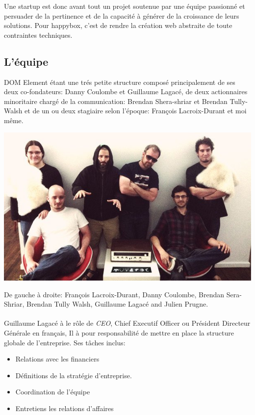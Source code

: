 \documentclass[11pt, a4paper ]{article}
\begin{document}
Une startup est donc avant tout un projet soutenue par une équipe passionné et persuader de la pertinence et de la capacité à générer de la croissance de leurs solutions. Pour happybox, c'est de rendre la création web abstraite de toute contraintes techniques.



		\subsection{L'équipe} %
DOM Element étant une trés petite structure composé principalement de ses deux co-fondateurs: Danny Coulombe et Guillaume Lagacé, de deux actionnaires minoritaire chargé de la communication: Brendan Shera-shriar et Brendan Tully-Walsh et de un ou deux stagiaire selon l'époque: François Lacroix-Durant et moi même.

\begin{center}
	\includegraphics[width=\textwidth]{images/team/team.jpg}

	 De gauche à droite: François Lacroix-Durant, Danny Coulombe, Brendan Sera-Shriar, Brendan Tully Walsh, Guillaume Lagacé and Julien Prugne.
\end{center}

\paragraph{}
	Guillaume Lagacé à le rôle de \emph{CEO}, Chief Executif Officer ou Président Directeur Générale en français, Il à pour responsabilité de mettre en place la structure globale de l'entreprise.
	Ses tâches inclus:

		\begin{itemize}
			\item
				Relations avec les financiers
			\item
				Définitions de la stratégie d'entreprise.
			\item
				Coordination de l'équipe
			\item
				Entretiens les relations d'affaires
		\end{itemize}
\end{document}
